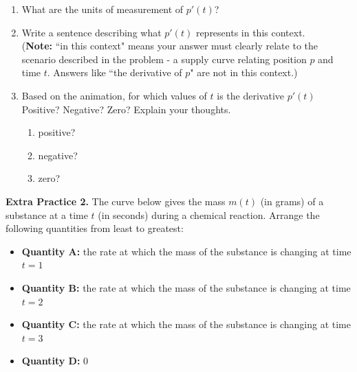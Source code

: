 \documentclass[10pt]{article}
\begin{document}
\begin{enumerate}

\item[(a)] What are the units of measurement of $p'(t)$?  

\item[(b)] Write a sentence describing what $p'(t)$ represents in this context.\\ 
({\bf Note:} ``in this context" means your answer must clearly relate to the scenario described in the problem - a supply curve relating position $p$ and time $t$. Answers like ``the derivative of $p$" are not in this context.)


\item[(c)] Based on the animation, for which values of $t$ is the derivative $p'(t)$ Positive? Negative? Zero? Explain your thoughts. 
  
    \begin{enumerate}
    \item[i.] positive?  \\
    \item[ii.] negative?\\
    \item[iii.] zero?  
    \end{enumerate}

\end{enumerate}



{\bf\color{blue}Extra Practice 2.}\reversemarginpar{} The curve below gives the mass $m(t)$ (in grams) of a substance at a time $t$ (in seconds) during a chemical reaction. Arrange the following quantities from least to greatest:
\begin{itemize}
\item {\bf Quantity A:} the rate at which the mass of the substance is changing at time $t=1$
\item {\bf Quantity B:} the rate at which the mass of the substance is changing at time $t=2$
\item {\bf Quantity C:} the rate at which the mass of the substance is changing at time $t=3$
\item {\bf Quantity D:} $0$
\end{itemize}
\end{document}
